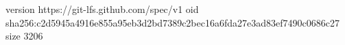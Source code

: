 version https://git-lfs.github.com/spec/v1
oid sha256:c2d5945a4916e855a95eb3d2bd7389c2bec16a6fda27e3ad83ef7490c0686c27
size 3206
